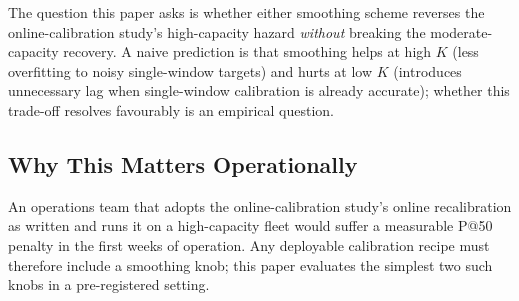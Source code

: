 The question this paper asks is whether either smoothing scheme
reverses the online-calibration study's high-capacity hazard \textit{without} breaking the
moderate-capacity recovery. A naive prediction is that smoothing
helps at high $K$ (less overfitting to noisy single-window targets)
and hurts at low $K$ (introduces unnecessary lag when single-window
calibration is already accurate); whether this trade-off resolves
favourably is an empirical question.

\subsection{Why This Matters Operationally}

An operations team that adopts the online-calibration study's online recalibration as
written and runs it on a high-capacity fleet would suffer a measurable
P@50 penalty in the first weeks of operation. Any deployable
calibration recipe must therefore include a smoothing knob; this
paper evaluates the simplest two such knobs in a pre-registered
setting.
